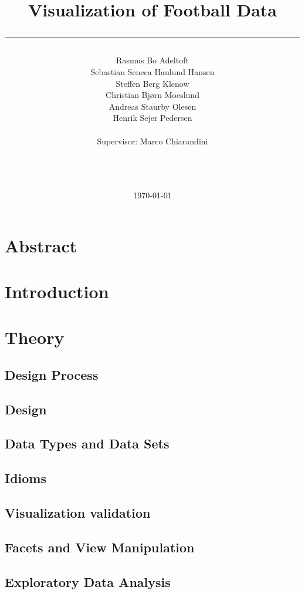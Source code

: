 \documentclass[a4paper,11pt]{article}
\title{Visualization of Football Data\\\rule{10cm}{0.5mm}}
\author{Rasmus Bo Adeltoft\\Sebastian Seneca Haulund Hansen\\Steffen Berg Klenow\\Christian Bjørn Moeslund\\Andreas Staurby Olesen\\Henrik Sejer Pedersen
\\\\Supervisor: Marco Chiarandini\\\rule{5.5cm}{0.5mm}\\}
\date{\today}
\begin{document}
\maketitle
\newpage
\section{Abstract}


\newpage
\tableofcontents
\newpage
\section{Introduction}


\section{Theory} %

\subsection{Design Process} %

\subsection{Design} %

\subsection{Data Types and Data Sets} %

\subsection{Idioms} %


\subsection{Visualization validation} %

\subsection{Facets and View Manipulation} %


\subsection{Exploratory Data Analysis} %

\end{document}

